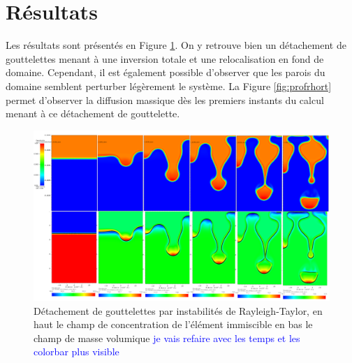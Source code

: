 \section{Résultats}
Les résultats sont présentés en Figure \ref{fig:rt}. On y retrouve bien un détachement de gouttelettes menant à une inversion totale et une relocalisation en fond de domaine. Cependant, il est également possible d'observer que les parois du domaine semblent perturber légèrement le système. La Figure \ref{fig:profrhort} permet d'observer la diffusion massique dès les premiers instants du calcul menant à ce détachement de gouttelette.
\begin{figure}[H]
	\centering
	\includegraphics[width=1\linewidth]{figure/RT}
	\caption[Détachement de goutellette]{Détachement de gouttelettes par instabilités de Rayleigh-Taylor, en haut le champ de concentration de l'élément immiscible en bas le champ de masse volumique \textcolor{blue}{je vais refaire avec les temps et les colorbar plus visible}}
	\label{fig:rt}
\end{figure}

